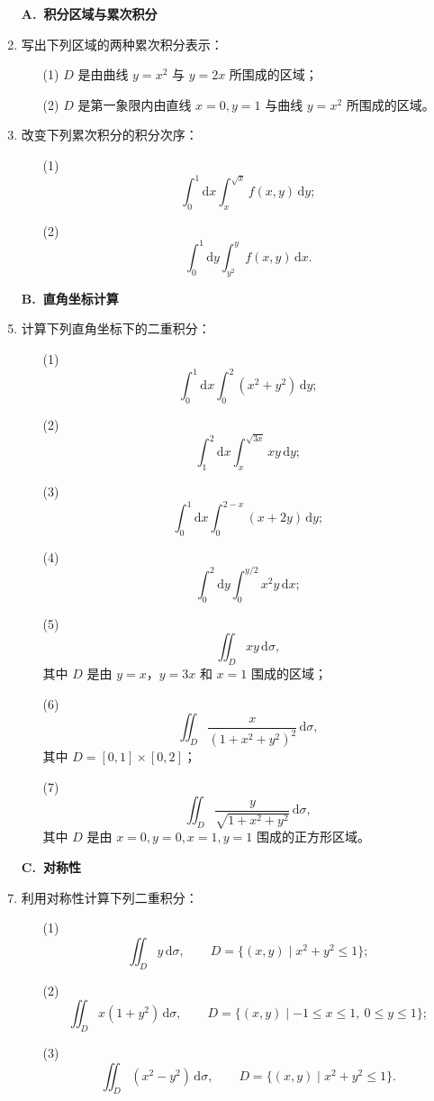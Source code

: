 \documentclass[fontset=fandol]{ctexart}
\newcommand{\dd}{\mathrm{d}}
\begin{document}
\begin{enumerate}
\item[]\textbf{A.\ 积分区域与累次积分}
\item 写出下列区域的两种累次积分表示：
\begin{enumerate}
\item[(1)] $D$ 是由曲线 $y=x^2$ 与 $y=2x$ 所围成的区域；
\item[(2)] $D$ 是第一象限内由直线 $x=0,y=1$ 与曲线 $y=x^2$ 所围成的区域。
\end{enumerate}

\item 改变下列累次积分的积分次序：
\begin{enumerate}
\item[(1)]
\[
\int_0^1\dd x\int_x^{\sqrt{x}}f(x,y)\,\dd y;
\]
\item[(2)]
\[
\int_0^1\dd y\int_{y^2}^{y}f(x,y)\,\dd x.
\]
\end{enumerate}

\item[]\textbf{B.\ 直角坐标计算}
\setcounter{enumi}{0}
\item 计算下列直角坐标下的二重积分：
\begin{enumerate}
\item[(1)]
\[
\int_0^1\dd x\int_0^2(x^2+y^2)\,\dd y;
\]
\item[(2)]
\[
\int_1^2\dd x\int_x^{\sqrt{3x}}xy\,\dd y;
\]
\item[(3)]
\[
\int_0^1\dd x\int_0^{2-x}(x+2y)\,\dd y;
\]
\item[(4)]
\[
\int_0^2\dd y\int_0^{y/2}x^2y\,\dd x;
\]
\item[(5)]
\[
\iint_Dxy\,\dd\sigma,
\]
其中 $D$ 是由 $y=x$，$y=3x$ 和 $x=1$ 围成的区域；
\item[(6)]
\[
\iint_D\frac{x}{(1+x^2+y^2)^2}\,\dd\sigma,
\]
其中 $D=[0,1]\times[0,2]$；
\item[(7)]
\[
\iint_D\frac{y}{\sqrt{1+x^2+y^2}}\,\dd\sigma,
\]
其中 $D$ 是由 $x=0,y=0,x=1,y=1$ 围成的正方形区域。
\end{enumerate}

\item[]\textbf{C.\ 对称性}
\setcounter{enumi}{0}
\item 利用对称性计算下列二重积分：
\begin{enumerate}
\item[(1)]
\[
\iint_Dy\,\dd\sigma,
\qquad D=\{(x,y)\mid x^2+y^2\leq1\};
\]
\item[(2)]
\[
\iint_Dx(1+y^2)\,\dd\sigma,
\qquad D=\{(x,y)\mid-1\leq x\leq1,\ 0\leq y\leq1\};
\]
\item[(3)]
\[
\iint_D(x^2-y^2)\,\dd\sigma,
\qquad D=\{(x,y)\mid x^2+y^2\leq1\}.
\]
\end{enumerate}


\end{enumerate}
\end{document}
